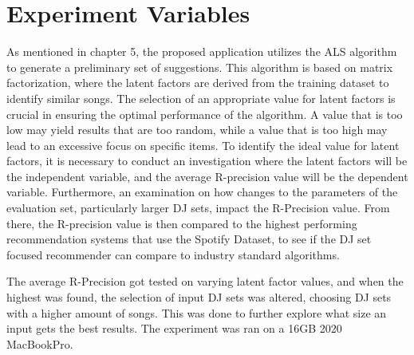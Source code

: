 \section{Experiment Variables}

As mentioned in chapter 5, the proposed application utilizes the ALS algorithm to generate a preliminary set of suggestions. This algorithm is based on matrix factorization, where the latent factors are derived from the training dataset to identify similar songs. The selection of an appropriate value for latent factors is crucial in ensuring the optimal performance of the algorithm. A value that is too low may yield results that are too random, while a value that is too high may lead to an excessive focus on specific items. To identify the ideal value for latent factors, it is necessary to conduct an  investigation where the latent factors will be the independent variable, and the average R-precision value will be the dependent variable. Furthermore, an examination on how changes to the parameters of the evaluation set, particularly larger DJ sets, impact the R-Precision value. From there, the R-precision value  is then compared to the highest performing recommendation systems that use the Spotify Dataset, to see if the DJ set focused recommender can compare to industry standard algorithms.

The average R-Precision got tested on varying latent factor values, and when the highest was found, the selection of input DJ sets was altered, choosing DJ sets with a higher amount of songs. This was done to further explore what size an input gets the best results. The experiment was ran on a 16GB 2020 MacBookPro.

